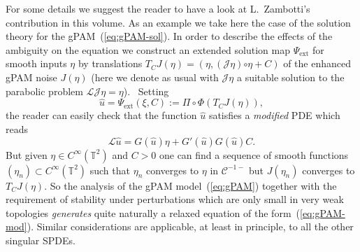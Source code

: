 \documentclass[a4paper, 11pt]{article}
\newcommand{\assign}{:=}
\newcommand{\tmtextit}[1]{{\itshape{#1}}}
\newcommand{\CC}{\mathcal{C}}
\newcommand{\LL}{\mathcal{L}}
\newcommand{\reso}{\mathord{\circ}}
\begin{document}
For some details we suggest the reader to have a look at L.~Zambotti's
contribution in this volume. As an example we take here the case of the
solution theory for the gPAM~(\ref{eq:gPAM-sol}). In order to describe the
effects of the ambiguity on the equation we construct an extended solution map
$\Psi_{\text{ext}}$ for smooth inputs $\eta$ by translations $T_{C} J
(\eta) = (\eta, (\mathcal{J}\! \eta) \reso \eta + C)$ of the enhanced gPAM
noise $J (\eta)$ (here we denote as usual with $\mathcal{J}\! \eta$ a suitable
solution to the parabolic problem $\LL \!\!\! \mathcal{J}\! \eta = \eta$). \ Setting
\[
   \hat{u} = \Psi_{\text{ext}} (\xi, C) \assign \Pi \circ \Phi (T_{C} J(\eta)),
\]
the reader can easily check that the function $\hat{u}$ satisfies a
\tmtextit{modified} PDE which reads
\begin{equation}\label{eq:gPAM-mod}
  \LL \hat{u} = G (\hat{u}) \eta + G' (\hat{u}) G (\hat{u}) C .
\end{equation}
But given $\eta \in C^\infty(\mathbb{T}^2)$ and $C>0$ one can find a sequence of smooth functions $(\eta_n) \subset  C^\infty(\mathbb{T}^2)$ such that $\eta_n$ converges to $\eta$ in $\CC^{-1-}$ but $J(\eta_n)$ converges to $T_CJ(\eta)$. So the analysis of the gPAM model~(\ref{eq:gPAM}) together with the requirement
of stability under perturbations which are only small in very weak topologies
\tmtextit{generates} quite naturally a relaxed equation of the
form~(\ref{eq:gPAM-mod}). Similar considerations are applicable, at least in
principle, to all the other singular SPDEs.
\end{document}

